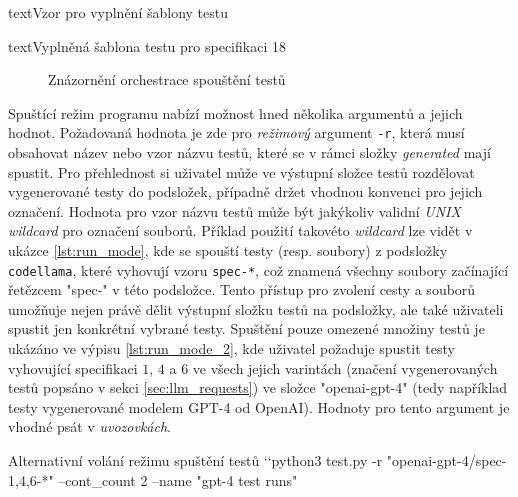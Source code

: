 \documentclass[czech, ma, kiv, he, iso690numb, pdf, viewonly]{fasthesis}
\begin{document}
\begin{code}{text}{Vzor pro vyplnění šablony testu \label{lst:template}}
{\begin{code}{text}{Vyplněná šablona testu pro specifikaci 18 \label{lst:spec18}}
{\begin{figure}
        \centering
        \caption{Znázornění orchestrace spouštění testů}
        \label{fig:orchestration}
    \end{figure}

    Spuštící režim programu nabízí možnost hned několika argumentů a jejich hodnot. Požadovaná hodnota je zde pro \textit{režimový} argument \verb|-r|, která musí obsahovat název nebo vzor názvu testů, které se v rámci složky \textit{generated} mají spustit. Pro přehlednost si uživatel může ve výstupní složce testů rozdělovat vygenerované testy do podsložek, případně držet vhodnou konvenci pro jejich označení. Hodnota pro vzor názvu testů může být jakýkoliv validní \textit{UNIX wildcard} pro označení souborů. Příklad použití takovéto \textit{wildcard} lze vidět v ukázce \ref{lst:run_mode}, kde se spouští testy (resp. soubory) z podsložky \verb|codellama|, které vyhovují vzoru \verb|spec-*|, což znamená všechny soubory začínající řetězcem "spec-"  v této podsložce. Tento přístup pro zvolení cesty a souborů umožňuje nejen právě dělit výstupní složku testů na podsložky, ale také uživateli spustit jen konkrétní vybrané testy. Spuštění pouze omezené množiny testů je ukázáno ve výpisu \ref{lst:run_mode_2}, kde uživatel požaduje spustit testy vyhovující specifikaci \(1\), \(4\) a \(6\) ve všech jejich varintách (značení vygenerovaných testů popsáno v sekci \ref{sec:llm_requests}) ve složce "openai-gpt-4" (tedy například testy vygenerované modelem GPT-4 od OpenAI). Hodnoty pro tento argument je vhodné psát v \emph{uvozovkách}.

    \begin{console}{Alternativní volání režimu spuštění testů \label{lst:run_mode_2}}
`\uxprompt`python3 test.py -r "openai-gpt-4/spec-{1,4,6}-*" --cont_count 2 --name "gpt-4 test runs"
    \end{console}

}
\end{code}}
\end{code}
\end{document}
